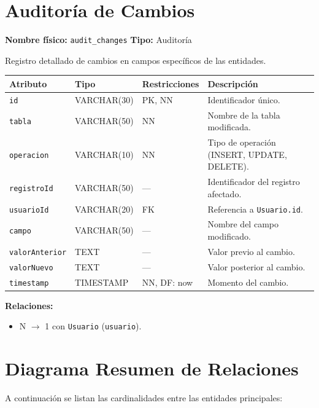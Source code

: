 \documentclass[12pt,a4paper]{article}
\newenvironment{tabladesc}[3]{%
  \section{#1}
  \textbf{Nombre físico:} \texttt{#2} \hfill \textbf{Tipo:} #3\par
  \medskip
}{%
  \bigskip
}
\begin{document}
\begin{tabladesc}{Auditoría de Cambios}{audit\_changes}{Auditoría}

Registro detallado de cambios en campos específicos de las entidades.

\bigskip
\begin{longtable}{L{3.5cm} L{2.5cm} L{2cm} L{7.5cm}}
\toprule
\textbf{Atributo} & \textbf{Tipo} & \textbf{Restricciones} & \textbf{Descripción} \\
\midrule
\endhead
\bottomrule
\endfoot
\texttt{id}          & VARCHAR(30)  & PK, NN & Identificador único. \\
\texttt{tabla}       & VARCHAR(50)  & NN     & Nombre de la tabla modificada. \\
\texttt{operacion}   & VARCHAR(10)  & NN     & Tipo de operación (INSERT, UPDATE, DELETE). \\
\texttt{registroId}  & VARCHAR(50)  & ---    & Identificador del registro afectado. \\
\texttt{usuarioId}   & VARCHAR(20)  & FK     & Referencia a \texttt{Usuario.id}. \\
\texttt{campo}       & VARCHAR(50)  & ---    & Nombre del campo modificado. \\
\texttt{valorAnterior}& TEXT        & ---    & Valor previo al cambio. \\
\texttt{valorNuevo}  & TEXT         & ---    & Valor posterior al cambio. \\
\texttt{timestamp}   & TIMESTAMP    & NN, DF: now & Momento del cambio. \\
\bottomrule
\end{longtable}

\textbf{Relaciones:}
\begin{itemize}[nosep]
  \item N $\rightarrow$ 1 con \texttt{Usuario} (\texttt{usuario}).
\end{itemize}
\end{tabladesc}

\newpage
\section{Diagrama Resumen de Relaciones}

A continuación se listan las cardinalidades entre las entidades principales:
\end{document}
